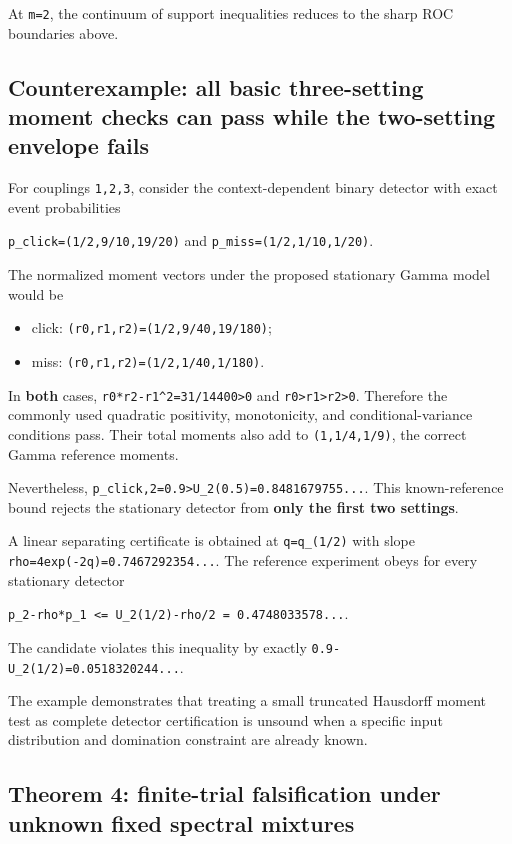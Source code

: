 \documentclass[
  10pt,
  a4paper,
]{article}
\providecommand{\tightlist}{%
  \setlength{\itemsep}{0pt}\setlength{\parskip}{0pt}}
\begin{document}
At \texttt{m=2}, the continuum of support inequalities reduces to the sharp ROC boundaries above.

\subsection{Counterexample: all basic three-setting moment checks can pass while the two-setting envelope fails}\label{counterexample-all-basic-three-setting-moment-checks-can-pass-while-the-two-setting-envelope-fails}

For couplings \texttt{1,2,3}, consider the context-dependent binary detector with exact event probabilities

\texttt{p\_click=(1/2,9/10,19/20)} and \texttt{p\_miss=(1/2,1/10,1/20)}.

The normalized moment vectors under the proposed stationary Gamma model would be

\begin{itemize}
\tightlist
\item
  click: \texttt{(r0,r1,r2)=(1/2,9/40,19/180)};
\item
  miss: \texttt{(r0,r1,r2)=(1/2,1/40,1/180)}.
\end{itemize}

In \textbf{both} cases, \texttt{r0*r2-r1\^{}2=31/14400\textgreater{}0} and \texttt{r0\textgreater{}r1\textgreater{}r2\textgreater{}0}. Therefore the commonly used quadratic positivity, monotonicity, and conditional-variance conditions pass. Their total moments also add to \texttt{(1,1/4,1/9)}, the correct Gamma reference moments.

Nevertheless, \texttt{p\_click,2=0.9\textgreater{}U\_2(0.5)=0.8481679755...}. This known-reference bound rejects the stationary detector from \textbf{only the first two settings}.

A linear separating certificate is obtained at \texttt{q=q\_(1/2)} with slope \texttt{rho=4exp(-2q)=0.7467292354...}. The reference experiment obeys for every stationary detector

\texttt{p\_2-rho*p\_1\ \textless{}=\ U\_2(1/2)-rho/2\ =\ 0.4748033578...}.

The candidate violates this inequality by exactly \texttt{0.9-U\_2(1/2)=0.0518320244...}.

The example demonstrates that treating a small truncated Hausdorff moment test as complete detector certification is unsound when a specific input distribution and domination constraint are already known.

\subsection{Theorem 4: finite-trial falsification under unknown fixed spectral mixtures}\label{theorem-4-finite-trial-falsification-under-unknown-fixed-spectral-mixtures}
\end{document}
